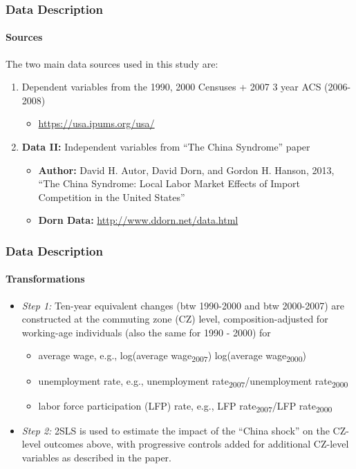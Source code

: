 \begin{frame}
    \frametitle{Data Description}
    \framesubtitle{Sources}
    The two main data sources used in this study are:
    \begin{enumerate}
        \item Dependent variables from the 1990, 2000 Censuses + 2007 3 year ACS (2006-2008)
        \begin{itemize}
            \item \url{https://usa.ipums.org/usa/}
        \end{itemize}
        \item \textbf{Data II:} Independent variables from “The China Syndrome” paper
        \begin{itemize}
            \item \textbf{Author:} David H. Autor, David Dorn, and Gordon H. Hanson, 2013, “The China Syndrome: Local Labor Market Effects of Import Competition in the United States”
            \item \textbf{Dorn Data:} \url{http://www.ddorn.net/data.html}
        \end{itemize}
    \end{enumerate}
\end{frame}
\begin{frame}
    \frametitle{Data Description}
    \framesubtitle{Transformations}
    \begin{itemize}
        \item \textit{Step 1:} Ten-year equivalent changes (btw 1990-2000 and btw 2000-2007) are constructed at the commuting zone (CZ) level, composition-adjusted for working-age individuals (also the same for 1990 - 2000) for
        \begin{itemize}
            \item average wage, e.g., log(average wage\textsubscript{2007}) log(average wage\textsubscript{2000})
            \item unemployment rate, e.g., unemployment rate\textsubscript{2007}/unemployment rate\textsubscript{2000}
            \item labor force participation (LFP) rate, e.g., LFP rate\textsubscript{2007}/LFP rate\textsubscript{2000}
        \end{itemize}
        \item \textit{Step 2:} 2SLS is used to estimate the impact of the “China shock” on the CZ-level outcomes above, with progressive controls added for additional CZ-level variables as described in the paper.
    \end{itemize}
\end{frame}




